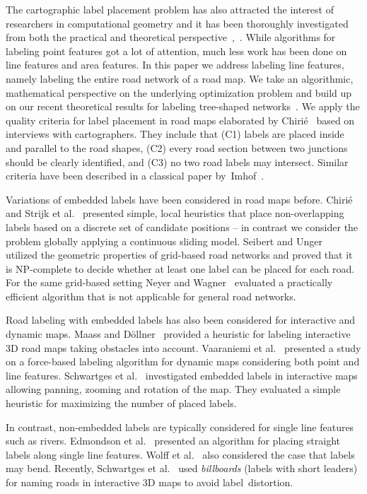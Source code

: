 \documentclass[a4paper,11pt]{article}
\begin{document}
The cartographic label placement problem has also attracted the interest of researchers in computational geometry and it has been thoroughly investigated from both the practical and theoretical perspective~\cite[Chapter
58.3.1]{overview},~\cite{bibliography}.
While algorithms for labeling point features
got a lot of attention, much less work has been done on line
features and area features. In this paper we address
labeling line features, namely labeling the entire road network of a road map.  We take an algorithmic, mathematical perspective on the underlying optimization
problem and build up on our recent theoretical results for labeling tree-shaped networks~\cite{rlTheory}.  We apply the quality
criteria for label placement in road maps elaborated by
Chirié~\cite{street-name-placement} based on interviews with
cartographers. They include that (C1) labels are placed inside and
parallel to the road shapes, (C2) every road section between two
junctions should be clearly identified, and (C3) no two road labels
may intersect. Similar criteria have been described in a classical paper by~Imhof~\cite{imhof}. 

 Variations of embedded labels have been considered in road maps
 before. Chirié~\cite{street-name-placement} and Strijk et
 al.~\cite[Ch. 9]{strijk2001} presented simple, local heuristics that
 place non-overlapping labels based on a discrete set of candidate
 positions -- in contrast we consider the problem globally applying a
 continuous sliding model.  Seibert and Unger~\cite{labelingManhattan}
 utilized the geometric properties of grid-based road networks and
 proved that it is NP-complete to decide whether at least one label
 can be placed for each road. For the same grid-based setting Neyer
 and Wagner~\cite{downtownLabeling} evaluated a practically efficient
 algorithm that is not applicable for general road networks.

Road labeling with embedded labels has also been considered for
interactive and dynamic maps. Maass and Döllner~\cite{Maass07} provided a
heuristic for labeling interactive 3D road maps taking
obstacles into account. Vaaraniemi et al.~\cite{Vaaraniemi12} presented a
study on a force-based labeling algorithm for dynamic maps considering
both point and line features. Schwartges et al.~\cite{swh-lsime-acm14}
investigated embedded labels in interactive maps allowing panning,
zooming and rotation of the map. They evaluated a simple
heuristic for maximizing the number of placed labels. 

In contrast, non-embedded labels are typically considered for single
line features such as rivers. Edmondson et
al.~\cite{Edmondson96} presented an algorithm for placing straight
labels along single line features. Wolff et al.~\cite{wkksa-seahq-00}
also considered the case that labels may bend. Recently, Schwartges et
al.~\cite{Schwartges2015} used \emph{billboards} (labels with short leaders) for naming roads in interactive 3D maps to avoid label~distortion.
\end{document}
